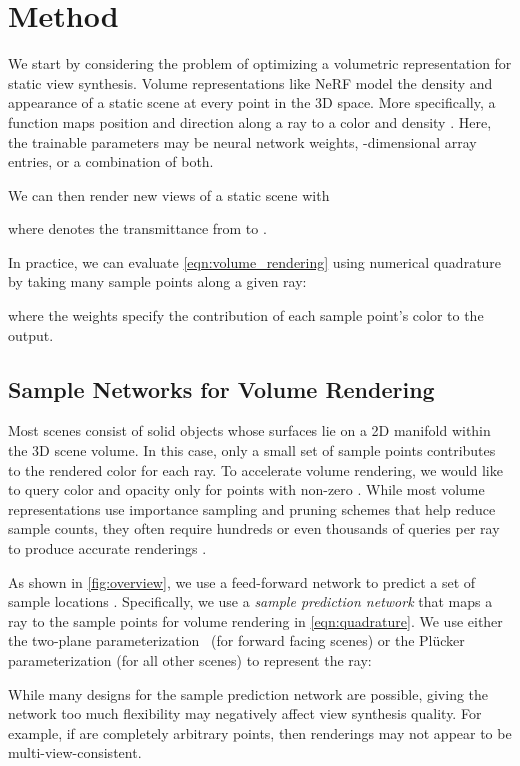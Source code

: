 \documentclass[10pt,twocolumn,letterpaper]{article}
\begin{document}
{ 
\section{Method}
\label{sec:technical}


We start by considering the problem of optimizing a volumetric representation for static view synthesis.
Volume representations like NeRF \cite{MildeSTBRN2020} model the density and appearance of a static scene at every point in the 3D space.
More specifically, a function 
maps position  and direction  along a ray
to a color  and density .
Here, the trainable parameters  may be neural network weights, -dimensional array entries, or a combination of both.


We can then render new views of a static scene with

where  denotes the transmittance from  to .

In practice, we can evaluate \cref{eqn:volume_rendering} using numerical quadrature by taking many sample points along a given ray:

where the weights  specify the contribution of each sample point's color to the output.


\subsection{Sample Networks for Volume Rendering}
\label{sec:sampling}


Most scenes consist of solid objects whose surfaces lie on a 2D manifold within the 3D scene volume.
In this case, only a small set of sample points contributes to the rendered color for each ray.
To accelerate volume rendering, we would like to query color and opacity only for points with non-zero .
While most volume representations use importance sampling and pruning schemes that help reduce sample counts, they often require hundreds or even thousands of queries per ray to produce accurate renderings \cite{ChenXGYS2022, MuelleESK2022}.

As shown in \cref{fig:overview}, we use a feed-forward network to predict a set of sample locations .
Specifically, we use a \emph{sample prediction network}  that maps a ray  to the sample points  for volume rendering in \cref{eqn:quadrature}. 
We use either the two-plane parameterization~\cite{LevoyH1996} (for forward facing scenes) or the Plücker parameterization (for all other scenes) to represent the ray:

While many designs for the sample prediction network  are possible, giving the network too much flexibility may negatively affect view synthesis quality.
For example, if  are completely arbitrary points, then renderings may not appear to be multi-view-consistent.

}
\end{document}
